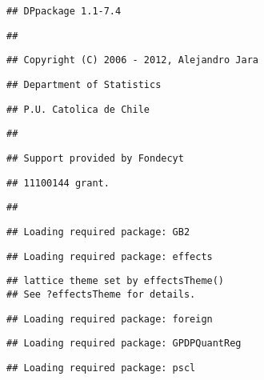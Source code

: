 \documentclass[11pt,]{article}
\begin{document}
\begin{verbatim}
## DPpackage 1.1-7.4
\end{verbatim}

\begin{verbatim}
## 
\end{verbatim}

\begin{verbatim}
## Copyright (C) 2006 - 2012, Alejandro Jara
\end{verbatim}

\begin{verbatim}
## Department of Statistics
\end{verbatim}

\begin{verbatim}
## P.U. Catolica de Chile
\end{verbatim}

\begin{verbatim}
## 
\end{verbatim}

\begin{verbatim}
## Support provided by Fondecyt
\end{verbatim}

\begin{verbatim}
## 11100144 grant.
\end{verbatim}

\begin{verbatim}
## 
\end{verbatim}

\begin{verbatim}
## Loading required package: GB2
\end{verbatim}

\begin{verbatim}
## Loading required package: effects
\end{verbatim}

\begin{verbatim}
## lattice theme set by effectsTheme()
## See ?effectsTheme for details.
\end{verbatim}

\begin{verbatim}
## Loading required package: foreign
\end{verbatim}

\begin{verbatim}
## Loading required package: GPDPQuantReg
\end{verbatim}

\begin{verbatim}
## Loading required package: pscl
\end{verbatim}
\end{document}
